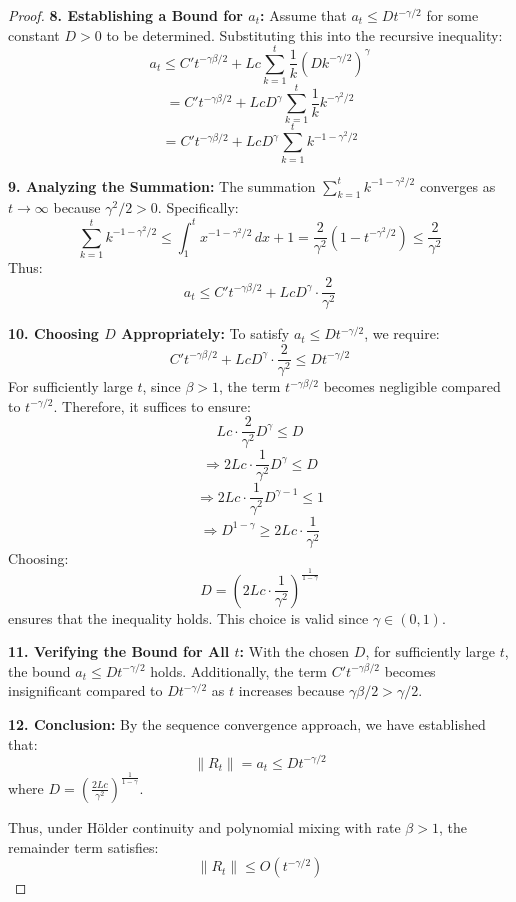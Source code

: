 \begin{proof}
\textbf{8. Establishing a Bound for \( a_t \):}
Assume that \( a_t \leq D t^{-\gamma/2} \) for some constant \( D > 0 \) to be determined. Substituting this into the recursive inequality:
\[
a_t \leq C' t^{-\gamma\beta/2} + L c \sum_{k=1}^t \frac{1}{k} (D k^{-\gamma/2})^\gamma
\]
\[
= C' t^{-\gamma\beta/2} + L c D^\gamma \sum_{k=1}^t \frac{1}{k} k^{-\gamma^2/2}
\]
\[
= C' t^{-\gamma\beta/2} + L c D^\gamma \sum_{k=1}^t k^{-1 - \gamma^2/2}
\]

\textbf{9. Analyzing the Summation:}
The summation \( \sum_{k=1}^t k^{-1 - \gamma^2/2} \) converges as \( t \to \infty \) because \( \gamma^2/2 > 0 \). Specifically:
\[
\sum_{k=1}^t k^{-1 - \gamma^2/2} \leq \int_{1}^{t} x^{-1 - \gamma^2/2} \, dx + 1 = \frac{2}{\gamma^2} \left(1 - t^{-\gamma^2/2}\right) \leq \frac{2}{\gamma^2}
\]
Thus:
\[
a_t \leq C' t^{-\gamma\beta/2} + L c D^\gamma \cdot \frac{2}{\gamma^2}
\]

\textbf{10. Choosing \( D \) Appropriately:}
To satisfy \( a_t \leq D t^{-\gamma/2} \), we require:
\[
C' t^{-\gamma\beta/2} + L c D^\gamma \cdot \frac{2}{\gamma^2} \leq D t^{-\gamma/2}
\]
For sufficiently large \( t \), since \( \beta > 1 \), the term \( t^{-\gamma\beta/2} \) becomes negligible compared to \( t^{-\gamma/2} \). Therefore, it suffices to ensure:
\[
L c \cdot \frac{2}{\gamma^2} D^\gamma \leq D
\]
\[
\Rightarrow 2 L c \cdot \frac{1}{\gamma^2} D^\gamma \leq D
\]
\[
\Rightarrow 2 L c \cdot \frac{1}{\gamma^2} D^{\gamma - 1} \leq 1
\]
\[
\Rightarrow D^{1 - \gamma} \geq 2 L c \cdot \frac{1}{\gamma^2}
\]
Choosing:
\[
D = \left( 2 L c \cdot \frac{1}{\gamma^2} \right)^{\frac{1}{1 - \gamma}}
\]
ensures that the inequality holds. This choice is valid since \( \gamma \in (0, 1) \).

\textbf{11. Verifying the Bound for All \( t \):}
With the chosen \( D \), for sufficiently large \( t \), the bound \( a_t \leq D t^{-\gamma/2} \) holds. Additionally, the term \( C' t^{-\gamma\beta/2} \) becomes insignificant compared to \( D t^{-\gamma/2} \) as \( t \) increases because \( \gamma\beta/2 > \gamma/2 \).

\textbf{12. Conclusion:}
By the sequence convergence approach, we have established that:
\[
\|R_t\| = a_t \leq D t^{-\gamma/2}
\]
where \( D = \left( \frac{2 L c}{\gamma^2} \right)^{\frac{1}{1 - \gamma}} \).

Thus, under Hölder continuity and polynomial mixing with rate \( \beta > 1 \), the remainder term satisfies:
\[
\|R_t\| \leq O(t^{-\gamma/2})
\]
\end{proof}

